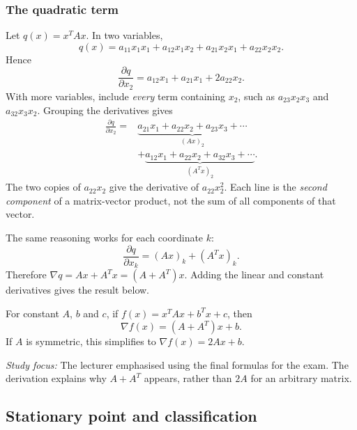\subsubsection*{The quadratic term}
Let $q(x)=x^TAx$. In two variables,
\[
	q(x)=a_{11}x_1x_1+a_{12}x_1x_2+a_{21}x_2x_1+a_{22}x_2x_2.
\]
Hence
\[
	\frac{\partial q}{\partial x_2}=a_{12}x_1+a_{21}x_1+2a_{22}x_2.
\]
With more variables, include \emph{every} term containing $x_2$, such as $a_{23}x_2x_3$ and $a_{32}x_3x_2$. Grouping the derivatives gives
\begin{align*}
	\frac{\partial q}{\partial x_2}
	={} & \underbrace{a_{21}x_1+a_{22}x_2+a_{23}x_3+\cdots}_{(Ax)_2}     \\
	    & +\underbrace{a_{12}x_1+a_{22}x_2+a_{32}x_3+\cdots}_{(A^Tx)_2}.
\end{align*}
The two copies of $a_{22}x_2$ give the derivative of $a_{22}x_2^2$. Each line is the \emph{second component} of a matrix-vector product, not the sum of all components of that vector.

The same reasoning works for each coordinate $k$:
\[
	\frac{\partial q}{\partial x_k}=(Ax)_k+(A^Tx)_k.
\]
Therefore $\nabla q=Ax+A^Tx=(A+A^T)x$. Adding the linear and constant derivatives gives the result below.

\begin{theorem}\label{thm:lec10-gradient}
	For constant $A$, $b$ and $c$, if $f(x)=x^TAx+b^Tx+c$, then
	\begin{equation}\label{eq:lec10-gradient}
		\boxed{\nabla f(x)=(A+A^T)x+b.}
	\end{equation}
	If $A$ is symmetric, this simplifies to $\nabla f(x)=2Ax+b$.
\end{theorem}
\noindent\textit{Study focus:} The lecturer emphasised using the final formulas for the exam. The derivation explains why $A+A^T$ appears, rather than $2A$ for an arbitrary matrix.

\clearpage
\subsection{Stationary point and classification}\label{subsec:stationary-point-and-classification-1}
